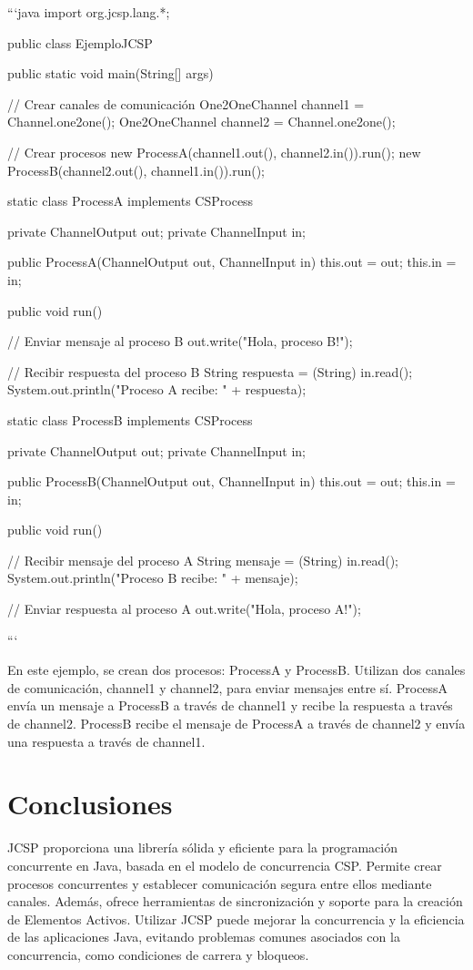 ```java
import org.jcsp.lang.*;

public class EjemploJCSP {
	public static void main(String[] args) {
		// Crear canales de comunicación
		One2OneChannel channel1 = Channel.one2one();
		One2OneChannel channel2 = Channel.one2one();
		
		// Crear procesos
		new ProcessA(channel1.out(), channel2.in()).run();
		new ProcessB(channel2.out(), channel1.in()).run();
	}
	
	static class ProcessA implements CSProcess {
		private ChannelOutput out;
		private ChannelInput in;
		
		public ProcessA(ChannelOutput out, ChannelInput in) {
			this.out = out;
			this.in = in;
		}
		
		public void run() {
			// Enviar mensaje al proceso B
			out.write("Hola, proceso B!");
			
			// Recibir respuesta del proceso B
			String respuesta = (String) in.read();
			System.out.println("Proceso A recibe: " + respuesta);
		}
	}
	
	static class ProcessB implements CSProcess {
		private ChannelOutput out;
		private ChannelInput in;
		
		public ProcessB(ChannelOutput out, ChannelInput in) {
			this.out = out;
			this.in = in;
		}
		
		public void run() {
			// Recibir mensaje del proceso A
			String mensaje = (String) in.read();
			System.out.println("Proceso B recibe: " + mensaje);
			
			// Enviar respuesta al proceso A
			out.write("Hola, proceso A!");
		}
	}
}
```

En este ejemplo, se crean dos procesos: ProcessA y ProcessB. Utilizan dos canales de comunicación, channel1 y channel2, para enviar mensajes entre sí. ProcessA envía un mensaje a ProcessB a través de channel1 y recibe la respuesta a través de channel2. ProcessB recibe el mensaje de ProcessA a través de channel2 y envía una respuesta a través de channel1.

\section*{Conclusiones}
JCSP proporciona una librería sólida y eficiente para la programación concurrente en Java, basada en el modelo de concurrencia CSP. Permite crear procesos concurrentes y establecer comunicación segura entre ellos mediante canales. Además, ofrece herramientas de sincronización y soporte para la creación de Elementos Activos. Utilizar JCSP puede mejorar la concurrencia y la eficiencia de las aplicaciones Java, evitando problemas comunes asociados con la concurrencia, como condiciones de carrera y bloqueos.